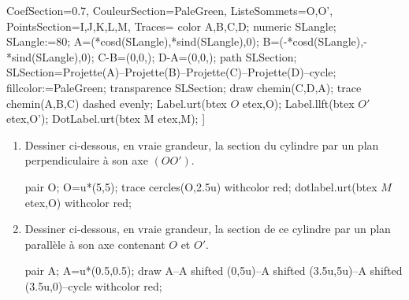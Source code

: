 \begin{corrige}
\begin{minipage}{0.55\linewidth}
\begin{center}
{                    CoefSection=0.7,
                    CouleurSection=PaleGreen,
                    ListeSommets={O,O'},
                    PointsSection={I,J,K,L,M},
                    Traces={
                        color A,B,C,D;
                        numeric SLangle;
                        SLangle:=80;
                        A=(*cosd(SLangle),*sind(SLangle),0);
                        B=(-*cosd(SLangle),-*sind(SLangle),0);
                        C-B=(0,0,);
                        D-A=(0,0,);                
                        path SLSection;
                        SLSection=Projette(A)--Projette(B)--Projette(C)--Projette(D)--cycle;
                        fillcolor:=PaleGreen;
                        transparence SLSection;%
                        draw chemin(C,D,A);
                        trace chemin(A,B,C) dashed evenly;
                        Label.urt(btex $O$ etex,O);
                        Label.llft(btex $O'$ etex,O');
                        DotLabel.urt(btex M etex,M);                
                    }
                ]%
            }
        \end{center}
    \end{minipage}
    \begin{enumerate}
        \item Dessiner ci-dessous, en vraie grandeur, la section du cylindre par un plan perpendiculaire à son axe $(OO')$.
        
        \begin{Geometrie}
            pair O;
            O=u*(5,5);
            trace cercles(O,2.5u) withcolor red;
            dotlabel.urt(btex $M$ etex,O) withcolor red;
        \end{Geometrie}
        \item Dessiner ci-dessous, en vraie grandeur, la section de ce cylindre par un plan parallèle à son axe contenant $O$ et $O'$.
        
        \medskip
        \begin{Geometrie}
            pair A;
            A=u*(0.5,0.5);            
            draw A--A shifted (0,5u)--A shifted (3.5u,5u)--A shifted (3.5u,0)--cycle withcolor red;
        \end{Geometrie}
    \end{enumerate}
\end{corrige}
